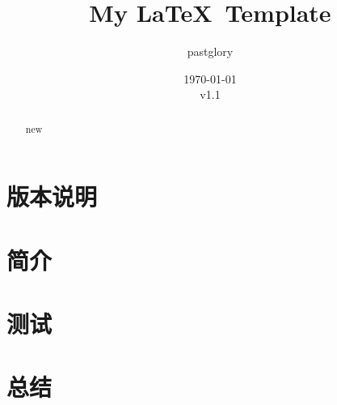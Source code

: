 \documentclass[zh, a4paper, 12pt]{pgreport}
\title {My \LaTeX\ Template}
\author{pastglory}%
\date{\today\\v1.1}
\begin{document}
\maketitle
\tableofcontents
\setcounter{page}{0}
\thispagestyle{empty}

\section*{版本说明}


\newpage

\begin{abstract}
    \normalsize
    
\end{abstract}

\renewcommand{\abstractname}{Abstract}

\begin{abstract}
new
\end{abstract}

\section{简介}


\section{测试}


\section{总结}



\end{document}
